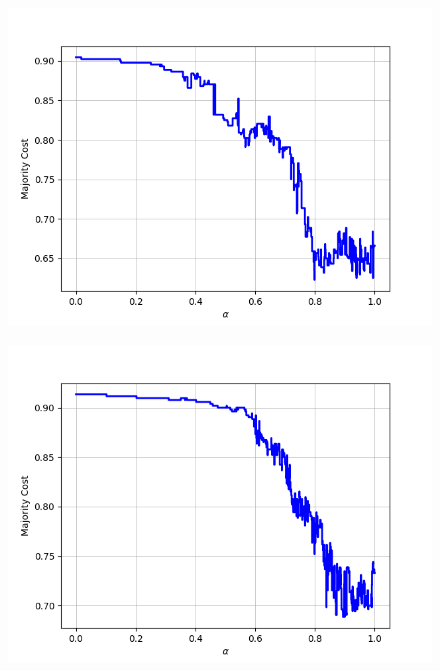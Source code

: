 \begin{figure}[H]
\begin{minipage}{.24\textwidth}
  {\includegraphics[width=\linewidth]{plots/omniglot-intra-sc/Cyrillic}}
\end{minipage}
\begin{minipage}{.24\textwidth}
  \centering
  {\includegraphics[width=\linewidth]{plots/omniglot-intra-sc/Early_Aramaic}}
\end{minipage}
\begin{minipage}{.24\textwidth}
  \centering

\end{minipage}
\end{figure}
